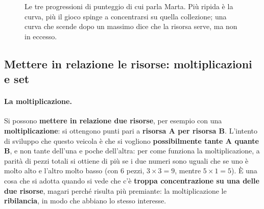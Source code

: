 \begin{figure}[htbp]
\centering
{}
\caption{Le tre progressioni di punteggio di cui parla Marta. Più ripida è la curva, più il
gioco spinge a concentrarsi su quella collezione; una curva che scende dopo un massimo dice
che la risorsa serve, ma non in eccesso.}
\label{a14:fig:progressioni}
\end{figure}

\subsection{Mettere in relazione le risorse: moltiplicazioni e set}

\paragraph{La moltiplicazione.} Si possono \textbf{mettere in relazione due risorse}, per
esempio con una \textbf{moltiplicazione}: si ottengono punti pari a \textbf{risorsa A per risorsa
B}. L'intento di sviluppo che questo veicola è che si vogliono \textbf{possibilmente tante A
quante B}, e non tante dell'una e poche dell'altra: per come funziona la moltiplicazione, a
parità di pezzi totali si ottiene di più se i due numeri sono uguali che se uno è molto alto e
l'altro molto basso (con 6 pezzi, $3 \times 3 = 9$, mentre $5 \times 1 = 5$). È una cosa che si
adotta quando si vede che c'è \textbf{troppa concentrazione su una delle due risorse}, magari
perché risulta più premiante: la moltiplicazione le \textbf{ribilancia}, in modo che abbiano lo
stesso interesse.

